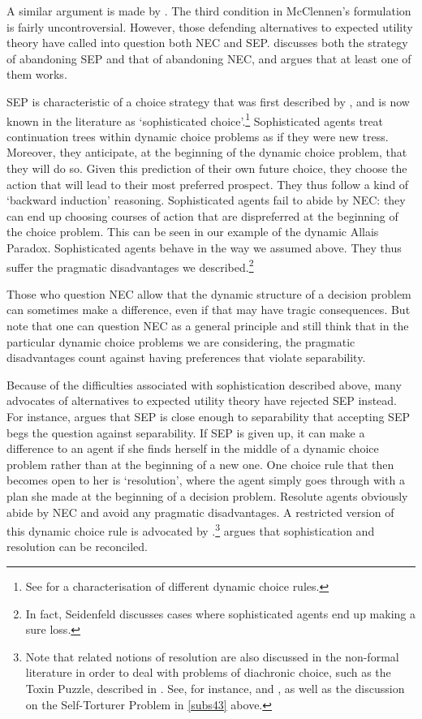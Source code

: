 A similar argument is made by \citet{Seidenfeld1988}. The third condition in McClennen's formulation is fairly uncontroversial. However, those defending alternatives to expected utility theory have called into question both NEC and SEP. \citet{Buchak2013} discusses both the strategy of abandoning SEP and that of abandoning NEC, and argues that at least one of them works.

SEP is characteristic of a choice strategy that was first described by \citet{Strotz1956}, and is now known in the literature as `sophisticated choice'.\footnote{See \citet{McClennen1990} for a characterisation of different dynamic choice rules.} Sophisticated agents treat continuation trees within dynamic choice problems as if they were new tress. Moreover, they anticipate, at the beginning of the dynamic choice problem, that they will do so. Given this prediction of their own future choice, they choose the action that will lead to their most preferred prospect. They thus follow a kind of `backward induction' reasoning. Sophisticated agents fail to abide by NEC: they can end up choosing courses of action that are dispreferred at the beginning of the choice problem. This can be seen in our example of the dynamic Allais Paradox. Sophisticated agents behave in the way we assumed above. They thus suffer the pragmatic disadvantages we described.\footnote{In fact, Seidenfeld discusses cases where sophisticated agents end up making a sure loss.}

Those who question NEC allow that the dynamic structure of a decision problem can sometimes make a difference, even if that may have tragic consequences. But note that one can question NEC as a general principle and still think that in the particular dynamic choice problems we are considering, the pragmatic disadvantages count against having preferences that violate separability.

Because of the difficulties associated with sophistication described above, many advocates of alternatives to expected utility theory have rejected SEP instead. For instance, \citet{Machina1989} argues that SEP is close enough to separability that accepting SEP begs the question against separability. If SEP is given up, it can make a difference to an agent if she finds herself in the middle of a dynamic choice problem rather than at the beginning of a new one. One choice rule that then becomes open to her is `resolution', where the agent simply goes through with a plan she made at the beginning of a decision problem. Resolute agents obviously abide by NEC and avoid any pragmatic disadvantages. A restricted version of this dynamic choice rule is advocated by \citet{McClennen1990}.\footnote{Note that related notions of resolution are also discussed in the non-formal literature in order to deal with problems of diachronic choice, such as the Toxin Puzzle, described in \citet{Kavka1983}. See, for instance, \citet{Holton2009} and \citet{Bratman1998}, as well as the discussion on the Self-Torturer Problem in \autoref{subs43} above.} \citet{Rabinowicz1995} argues that sophistication and resolution can be reconciled.

